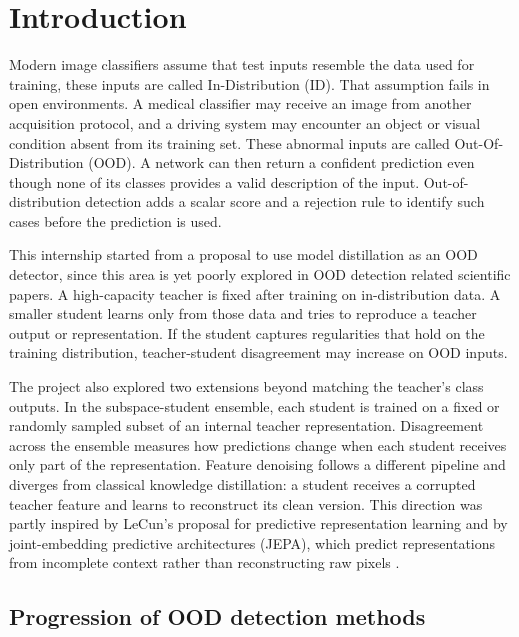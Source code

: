 \section{Introduction}

\headingindent
Modern image classifiers assume that test inputs resemble the data used for
training, these inputs are called In-Distribution (ID). That assumption fails in open environments. A medical classifier may
receive an image from another acquisition protocol, and a driving system may
encounter an object or visual condition absent from its training set. These abnormal inputs are called Out-Of-Distribution (OOD). A network
can then return a confident prediction even though none of its classes provides
a valid description of the input. Out-of-distribution detection adds a scalar
score and a rejection rule to identify such cases before the prediction is
used.

This internship started from a proposal to use model distillation as an
OOD detector, since this area is yet poorly explored in OOD detection related scientific papers. A high-capacity teacher is fixed after training on in-distribution
data. A smaller student learns only from those data and tries to reproduce a
teacher output or representation. If the student captures regularities that
hold on the training distribution, teacher-student disagreement may increase
on OOD inputs. 

The project also explored two extensions beyond matching the teacher's class
outputs. In the subspace-student ensemble, each student is trained on a fixed
or randomly sampled subset of an internal teacher representation. Disagreement
across the ensemble measures how predictions change when each student receives
only part of the representation. Feature denoising follows a different
pipeline and diverges from classical knowledge distillation: a student
receives a corrupted teacher feature and learns to reconstruct its clean
version. This direction was partly inspired by LeCun's proposal for predictive
representation learning and by joint-embedding predictive architectures
(JEPA), which predict representations from incomplete context rather than
reconstructing raw pixels \cite{lecun2022path,assran2023ijepa}.

\subsection{Progression of OOD detection methods}

